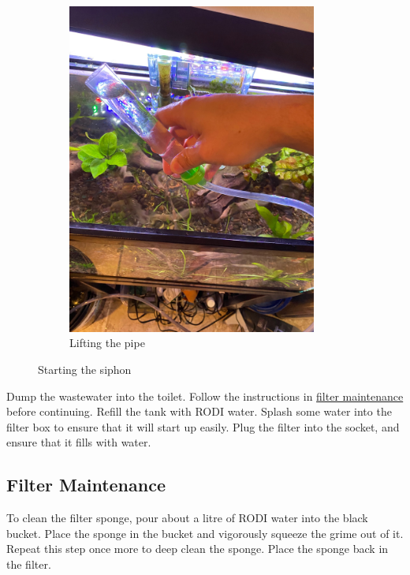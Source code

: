 \documentclass{report}
\begin{document}
\begin{figure}[H]
\begin{subfigure}{0.5\textwidth}
        \includegraphics[width=0.9\textwidth, angle=-90]{StartSiphon2.jpg}
        \caption{Lifting the pipe}
    \end{subfigure}
    \caption{Starting the siphon}
\end{figure}

Dump the wastewater into the toilet. Follow the instructions in \hyperref[subsubsec:filtermain]{filter maintenance} before 
continuing. Refill the tank with RODI water. Splash some water into the filter box to ensure that it will start up easily. 
Plug the filter into the socket, and ensure that it fills with water.

\subsection{Filter Maintenance}
\label{subsubsec:filtermain}

To clean the filter sponge, pour about a litre of RODI water into the black bucket. Place the sponge in the bucket and 
vigorously squeeze the grime out of it. Repeat this step once more to deep clean the sponge. Place the sponge back in the 
filter.
\end{document}
